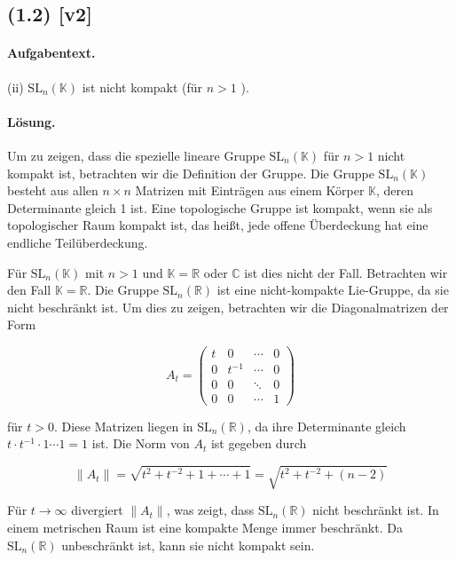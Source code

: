 \documentclass[11pt,a4paper]{article}
\begin{document}

\subsection*{(1.2) [v2]}
\paragraph{Aufgabentext.}
(ii) $\mathrm{SL}_n(\mathbb{K})$ ist nicht kompakt (für $n>1$ ).

\paragraph{Lösung.}
Um zu zeigen, dass die spezielle lineare Gruppe $\mathrm{SL}_n(\mathbb{K})$ für $n > 1$ nicht kompakt ist, betrachten wir die Definition der Gruppe. Die Gruppe $\mathrm{SL}_n(\mathbb{K})$ besteht aus allen $n \times n$ Matrizen mit Einträgen aus einem Körper $\mathbb{K}$, deren Determinante gleich 1 ist. Eine topologische Gruppe ist kompakt, wenn sie als topologischer Raum kompakt ist, das heißt, jede offene Überdeckung hat eine endliche Teilüberdeckung. 

Für $\mathrm{SL}_n(\mathbb{K})$ mit $n > 1$ und $\mathbb{K} = \mathbb{R}$ oder $\mathbb{C}$ ist dies nicht der Fall. Betrachten wir den Fall $\mathbb{K} = \mathbb{R}$. Die Gruppe $\mathrm{SL}_n(\mathbb{R})$ ist eine nicht-kompakte Lie-Gruppe, da sie nicht beschränkt ist. Um dies zu zeigen, betrachten wir die Diagonalmatrizen der Form

\[
A_t = \begin{pmatrix}
t & 0 & \cdots & 0 \\
0 & t^{-1} & \cdots & 0 \\
0 & 0 & \ddots & 0 \\
0 & 0 & \cdots & 1
\end{pmatrix}
\]

für $t > 0$. Diese Matrizen liegen in $\mathrm{SL}_n(\mathbb{R})$, da ihre Determinante gleich $t \cdot t^{-1} \cdot 1 \cdots 1 = 1$ ist. Die Norm von $A_t$ ist gegeben durch

\[
\|A_t\| = \sqrt{t^2 + t^{-2} + 1 + \cdots + 1} = \sqrt{t^2 + t^{-2} + (n-2)}
\]

Für $t \to \infty$ divergiert $\|A_t\|$, was zeigt, dass $\mathrm{SL}_n(\mathbb{R})$ nicht beschränkt ist. In einem metrischen Raum ist eine kompakte Menge immer beschränkt. Da $\mathrm{SL}_n(\mathbb{R})$ unbeschränkt ist, kann sie nicht kompakt sein.
\end{document}

